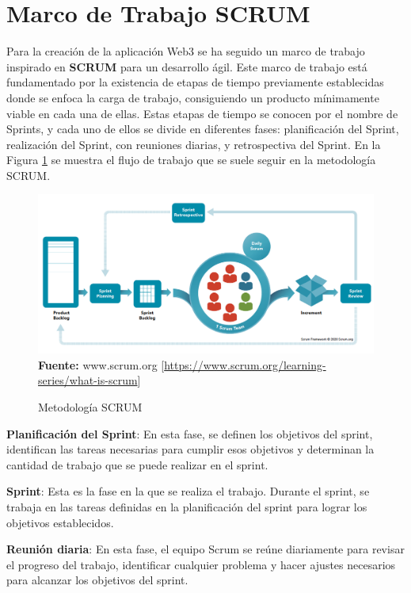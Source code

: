 \section{Marco de Trabajo SCRUM}\label{Scrum}

Para la creación de la aplicación Web3 se ha seguido un marco de trabajo
inspirado en \textbf{SCRUM} para un desarrollo ágil. Este marco de trabajo está
fundamentado por la existencia de etapas de tiempo previamente establecidas
donde se enfoca la carga de trabajo, consiguiendo un producto mínimamente
viable en cada una de ellas. Estas etapas de tiempo se conocen por el nombre de
Sprints, y cada uno de ellos se divide en diferentes fases: planificación del
Sprint, realización del Sprint, con reuniones diarias, y retrospectiva del
Sprint. En la Figura \ref*{fig:scrum-imagen} se muestra el flujo de trabajo que
se suele seguir en la metodología SCRUM.

\begin{figure}[htb!]
    \centering
    \caption{Metodología SCRUM} \label{fig:scrum-imagen}
    \centering
    \includegraphics[scale=0.4]{./Ilustraciones/scrum.png}\\
    \textbf{Fuente:} www.scrum.org [\url{https://www.scrum.org/learning-series/what-is-scrum}]
\end{figure}

\textbf{Planificación del Sprint}: En esta fase, se definen
los objetivos del sprint, identifican las tareas necesarias para cumplir esos
objetivos y determinan la cantidad de trabajo que se puede realizar en el
sprint.

\textbf{Sprint}: Esta es la fase en la que se realiza el trabajo. Durante el sprint, se
trabaja en las tareas definidas en la planificación del sprint
para lograr los objetivos establecidos.

\textbf{Reunión diaria}: En esta fase, el equipo Scrum se reúne diariamente para revisar
el progreso del trabajo, identificar cualquier problema y hacer ajustes
necesarios para alcanzar los objetivos del sprint.


